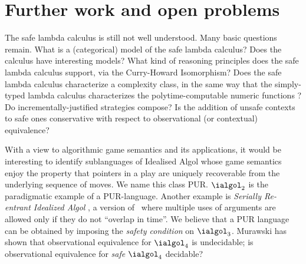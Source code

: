 
\section{Further work and open problems}

The safe lambda calculus is still not well understood. Many basic
questions remain. What is a (categorical) model of the safe lambda
calculus? Does the calculus have interesting models?  What kind of
reasoning principles does the safe lambda calculus support, via the
Curry-Howard Isomorphism? Does the safe lambda calculus characterize
a complexity class, in the same way that the simply-typed lambda
calculus characterizes the polytime-computable numeric functions
\cite{DBLP:conf/tlca/LeivantM93}?  Do incrementally-justified
strategies compose? Is the addition of unsafe contexts to safe ones
conservative with respect to observational (or contextual)
equivalence?

With a view to algorithmic game semantics and its applications, it
would be interesting to identify sublanguages of Idealised Algol
whose game semantics enjoy the property that pointers in a play are
uniquely recoverable from the underlying sequence of moves. We name
this class PUR. $\ialgol_2$ is the paradigmatic example of a
PUR-language. Another example is \emph{Serially Re-entrant Idealized
  Algol} \cite{abramsky:mchecking_ia}, a version of \ialgol\ where
multiple uses of arguments are allowed only if they do not ``overlap
in time''.  We believe that a PUR language can be obtained by
imposing the \emph{safety condition} on $\ialgol_3$. Murawski
\cite{Murawski2003} has shown that observational equivalence for
$\ialgol_4$ is undecidable; is observational equivalence for
\emph{safe} $\ialgol_4$ decidable?
